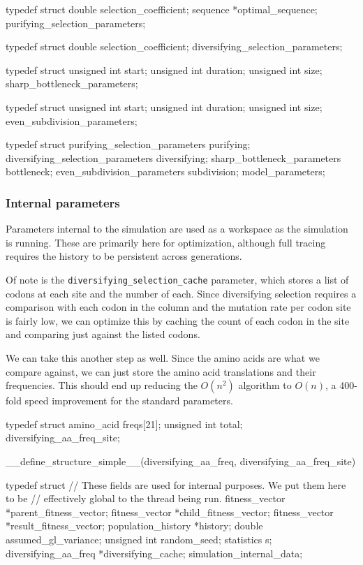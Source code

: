 \documentclass{article}
\begin{document}
\begin{ccode}
typedef struct {
  double		selection_coefficient;
  sequence		*optimal_sequence;
} purifying_selection_parameters;

typedef struct {
  double		selection_coefficient;
} diversifying_selection_parameters;

typedef struct {
  unsigned int		start;
  unsigned int		duration;
  unsigned int		size;
} sharp_bottleneck_parameters;

typedef struct {
  unsigned int		start;
  unsigned int		duration;
  unsigned int		size;
} even_subdivision_parameters;

typedef struct {
  purifying_selection_parameters	purifying;
  diversifying_selection_parameters	diversifying;
  sharp_bottleneck_parameters		bottleneck;
  even_subdivision_parameters		subdivision;
} model_parameters;
\end{ccode}

      \subsubsection{Internal parameters}
	\label{sec:internal-parameters}

	Parameters internal to the simulation are used as a workspace as the
	simulation is running. These are primarily here for optimization,
	although full tracing requires the history to be persistent across
	generations.

	Of note is the \verb|diversifying_selection_cache| parameter, which
	stores a list of codons at each site and the number of each. Since
	diversifying selection requires a comparison with each codon in the
	column and the mutation rate per codon site is fairly low, we can
	optimize this by caching the count of each codon in the site and
	comparing just against the listed codons.

	We can take this another step as well. Since the amino acids are what we
	compare against, we can just store the amino acid translations and their
	frequencies. This should end up reducing the $O(n^2)$ algorithm to
	$O(n)$, a 400-fold speed improvement for the standard parameters.

\begin{ccode}
typedef struct {
  amino_acid		freqs[21];
  unsigned int		total;
} diversifying_aa_freq_site;

__define_structure_simple__(diversifying_aa_freq, diversifying_aa_freq_site)

typedef struct {
  // These fields are used for internal purposes. We put them here to be
  // effectively global to the thread being run.
  fitness_vector	*parent_fitness_vector;
  fitness_vector	*child_fitness_vector;
  fitness_vector	*result_fitness_vector;
  population_history	*history;
  double		assumed_gl_variance;
  unsigned int		random_seed;
  statistics		s;
  diversifying_aa_freq	*diversifying_cache;
} simulation_internal_data;
\end{ccode}
\end{document}
